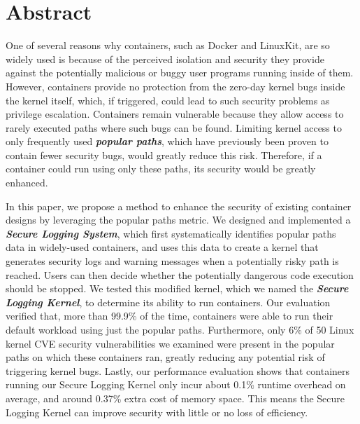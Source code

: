 \section*{Abstract}
One of several reasons why containers, such as Docker and LinuxKit, are so widely used is because of the perceived isolation and security they provide against 
the potentially malicious or buggy user programs running inside of them. However, containers provide no protection from the zero-day kernel bugs inside the kernel itself, 
which, if triggered, could lead to such security problems as privilege escalation. 
Containers remain vulnerable because they allow access to rarely executed paths where such bugs can be found. 
Limiting kernel access to only frequently used \textbf{\textit{popular paths}}, which have previously been proven to contain fewer security bugs, would greatly reduce this risk. 
Therefore, if a container could run using only these paths, its security would be greatly enhanced. 

In this paper, we propose a method to enhance the security of existing container designs by leveraging the popular paths metric. 
We designed and implemented a \textbf{\textit{Secure Logging System}}, which first systematically identifies popular paths data in widely-used containers, 
and uses this data to create a kernel that generates security logs and warning messages when a potentially risky path is reached. 
Users can then decide whether the potentially dangerous code execution should be stopped. We tested this modified kernel, which we named the \textbf{\textit{Secure Logging Kernel}}, 
to determine its  ability to run containers. Our evaluation verified that, more than 99.9\% of the time, containers were able to run their default workload using just the popular paths. 
Furthermore, only 6\% of 50 Linux kernel CVE security vulnerabilities we examined were present in the popular paths on which these containers ran, 
greatly reducing any potential risk of triggering kernel bugs. 
Lastly, our performance evaluation shows that containers running our Secure Logging Kernel only incur about 0.1\% runtime overhead on average, 
and around 0.37\% extra cost of memory space. This means the Secure Logging Kernel can improve security with little or no loss of efficiency. 